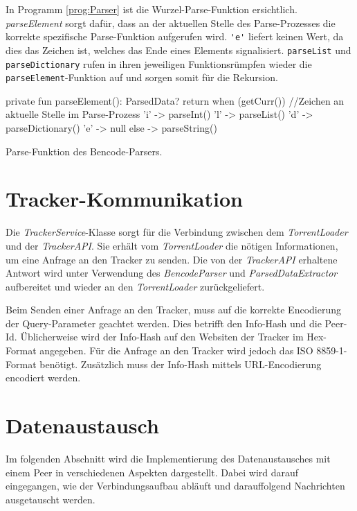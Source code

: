 In Programm \ref{prog:Parser} ist die Wurzel-Parse-Funktion ersichtlich. \emph{parseElement} sorgt dafür, dass an der aktuellen Stelle des Parse-Prozesses die korrekte spezifische Parse-Funktion aufgerufen wird. \verb|'e'| liefert keinen Wert, da dies das Zeichen ist, welches das Ende eines Elements signalisiert. \verb|parseList| und \verb|parseDictionary| rufen in ihren jeweiligen Funktionsrümpfen wieder die \verb|parseElement|-Funktion auf und sorgen somit für die Rekursion. 

\begin{program}
    \begin{GenericCode}[numbers=none]
private fun parseElement(): ParsedData? {
    return when (getCurr()) { //Zeichen an aktuelle Stelle im Parse-Prozess
        'i' -> parseInt()
        'l' -> parseList()
        'd' -> parseDictionary()
        'e' -> null
        else -> parseString()
    }
}
    \end{GenericCode}
    \caption{Parse-Funktion des Bencode-Parsers.}
    \label{prog:Parser}
    \end{program}

\section{Tracker-Kommunikation}

Die \emph{TrackerService}-Klasse sorgt für die Verbindung zwischen dem \emph{TorrentLoader} und der \emph{TrackerAPI}. Sie erhält vom \emph{TorrentLoader} die nötigen Informationen, um eine Anfrage an den Tracker zu senden. Die von der \emph{TrackerAPI} erhaltene Antwort wird unter Verwendung des \emph{BencodeParser} und \emph{ParsedDataExtractor} aufbereitet und wieder an den \emph{TorrentLoader} zurückgeliefert. 

Beim Senden einer Anfrage an den Tracker, muss auf die korrekte Encodierung der Query-Parameter geachtet werden. Dies betrifft den Info-Hash und die Peer-Id. Üblicherweise wird der Info-Hash auf den Websiten der Tracker im Hex-Format angegeben. Für die Anfrage an den Tracker wird jedoch das ISO 8859-1-Format benötigt. Zusätzlich muss der Info-Hash mittels URL-Encodierung encodiert werden.

\section{Datenaustausch}

Im folgenden Abschnitt wird die Implementierung des Datenaustausches mit einem Peer in verschiedenen Aspekten dargestellt. Dabei wird darauf eingegangen, wie der Verbindungsaufbau abläuft und darauffolgend Nachrichten ausgetauscht werden.

